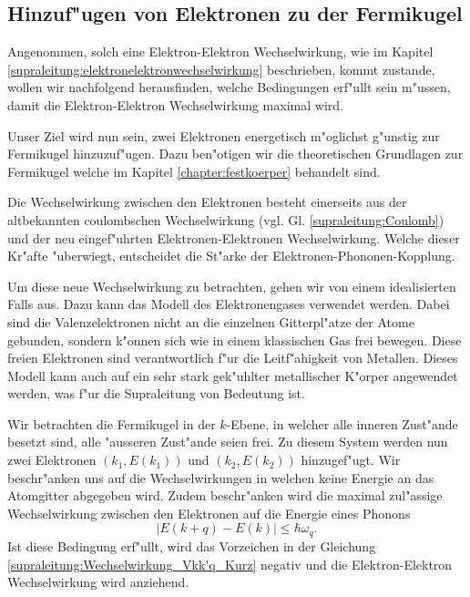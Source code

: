 \begin{refsection}
\section{Hinzuf"ugen von Elektronen zu der Fermikugel}
Angenommen, solch eine Elektron-Elektron Wechselwirkung, wie im Kapitel
\ref{supraleitung:elektronelektronwechselwirkung} beschrieben, kommt zustande,
wollen wir nachfolgend herausfinden, welche Bedingungen erf"ullt sein m"ussen, damit die
Elektron-Elektron Wechselwirkung maximal wird.

Unser Ziel wird nun sein, zwei Elektronen energetisch m"oglichst g"unstig zur Fermikugel hinzuzuf"ugen.
Dazu ben"otigen wir die theoretischen Grundlagen zur Fermikugel welche im Kapitel
\ref{chapter:festkoerper} behandelt sind.


Die Wechselwirkung zwischen den Elektronen besteht einerseits aus der altbekannten coulombschen
Wechselwirkung (vgl. Gl. \ref{supraleitung:Coulomb}) und der neu eingef"uhrten
Elektronen-Elektronen Wechselwirkung.
Welche dieser Kr"afte "uberwiegt, entscheidet die St"arke der Elektronen-Phononen-Kopplung.

Um diese neue Wechselwirkung zu betrachten, gehen wir von einem idealisierten Falls aus.
Dazu kann das Modell des Elektronengases verwendet werden.
Dabei sind die Valenzelektronen nicht an die einzelnen Gitterpl"atze der Atome gebunden,
sondern k"onnen sich wie in einem klassischen Gas frei bewegen.
Diese freien Elektronen sind verantwortlich f"ur die Leitf"ahigkeit von Metallen.
Dieses Modell kann auch auf ein sehr stark gek"uhlter metallischer K"orper angewendet werden,
was f"ur die Supraleitung von Bedeutung ist.

Wir betrachten die Fermikugel in der $k$-Ebene, in welcher alle inneren Zust"ande besetzt sind,
alle "ausseren Zust"ande seien frei.
Zu diesem System werden nun zwei Elektronen $(k_1,E(k_1))$ und $(k_2,E(k_2))$ hinzugef"ugt.
Wir beschr"anken uns auf die Wechselwirkungen in welchen keine Energie an das Atomgitter abgegeben wird.
Zudem beschr"anken wird die maximal zul"assige Wechselwirkung zwischen den Elektronen auf die
Energie eines Phonons
\begin{equation}
|E(k+q)-E(k)|\le\hbar\omega_q .
\label{supraleitung:Phonon Energie}
\end{equation}
Ist diese Bedingung erf"ullt, wird das Vorzeichen in der Gleichung \ref{supraleitung:Wechselwirkung_Vkk'q_Kurz} negativ und die Elektron-Elektron Wechselwirkung wird anziehend.


\end{refsection}
